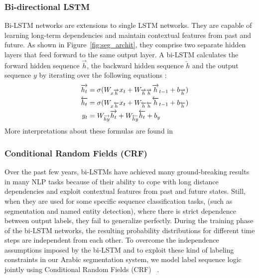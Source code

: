 \documentclass[11pt,letterpaper]{article}
\begin{document}
\subsubsection{ Bi-directional LSTM}
Bi-LSTM networks \cite{schuster1997bilstm} are extensions to single LSTM networks. They are capable of learning long-term dependencies and maintain contextual features from past and future. As shown in Figure~\ref{fig:seg_archit}, they comprise two separate hidden layers that feed forward to the same output layer. A bi-LSTM calculates the forward hidden sequence $\overrightarrow{h}$, the backward hidden sequence $\overleftarrow{h}$ and the output sequence $y$ by iterating over the following equations :
\vspace*{-1mm}
\begin{align*}
\hspace*{5mm}
\overrightarrow{h_t} &= \sigma(W_{x\overrightarrow{h}} x_t + W_{\overrightarrow{h}\overrightarrow{h}} \overrightarrow{h}_{t-1}+ b_{\overrightarrow{h}})
\\ \overleftarrow{h_t} &= \sigma(W_{x\overleftarrow{h}} x_t + W_{\overleftarrow{h}\overleftarrow{h}} \overleftarrow{h}_{t-1}+ b_{\overleftarrow{h}})
\\ y_{t} &= W_{\overrightarrow{h y}}\overrightarrow{h_t} + W_{\overleftarrow{h y}}\overleftarrow{h_t} +
 b_y
 \end{align*}
More interpretations about these formulas are found in 
\subsubsection{Conditional Random Fields (CRF)}
Over the past few years, bi-LSTMs have achieved many ground-breaking results in many NLP tasks because of their ability to cope with long distance dependencies and exploit contextual features from past and future states. Still, when they are used for some specific sequence classification tasks, (such as segmentation and named entity detection), where there is strict dependence between output labels, they fail to generalize perfectly. During the training phase of the bi-LSTM networks, the resulting probability distributions for different time steps are independent from each other. To overcome the independence assumptions imposed by the bi-LSTM and to exploit these kind of labeling constraints in our Arabic segmentation system, we model label sequence logic jointly using  Conditional Random Fields (CRF) ~\cite{crf}.
\end{document}
